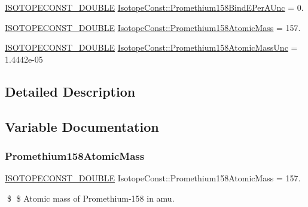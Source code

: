 \begin{DoxyCompactItemize}
\item 
\mbox{\hyperlink{group___isotope_const-_macros_ga8f45a7272ce02c0b4c65c44636ed719a}{I\+S\+O\+T\+O\+P\+E\+C\+O\+N\+S\+T\+\_\+\+D\+O\+U\+B\+LE}} \mbox{\hyperlink{group___isotope_const-_promethium-_pm158_gacf98f43e6d6f0bd043e4616759e9e5e1}{Isotope\+Const\+::\+Promethium158\+Bind\+E\+Per\+A\+Unc}} = 0.
\item 
\mbox{\hyperlink{group___isotope_const-_macros_ga8f45a7272ce02c0b4c65c44636ed719a}{I\+S\+O\+T\+O\+P\+E\+C\+O\+N\+S\+T\+\_\+\+D\+O\+U\+B\+LE}} \mbox{\hyperlink{group___isotope_const-_promethium-_pm158_gaf3b2f32ec08e9432ed95531dfaf3fa6e}{Isotope\+Const\+::\+Promethium158\+Atomic\+Mass}} = 157.
\item 
\mbox{\hyperlink{group___isotope_const-_macros_ga8f45a7272ce02c0b4c65c44636ed719a}{I\+S\+O\+T\+O\+P\+E\+C\+O\+N\+S\+T\+\_\+\+D\+O\+U\+B\+LE}} \mbox{\hyperlink{group___isotope_const-_promethium-_pm158_gab7fda659acc5e7c3ae06221aac8c976e}{Isotope\+Const\+::\+Promethium158\+Atomic\+Mass\+Unc}} = 1.\+4442e-\/05
\end{DoxyCompactItemize}


\subsection{Detailed Description}


\subsection{Variable Documentation}
\mbox{\label{group___isotope_const-_promethium-_pm158_gaf3b2f32ec08e9432ed95531dfaf3fa6e}} 
\subsubsection{\texorpdfstring{Promethium158\+Atomic\+Mass}{Promethium158AtomicMass}}
{\footnotesize\ttfamily \mbox{\hyperlink{group___isotope_const-_macros_ga8f45a7272ce02c0b4c65c44636ed719a}{I\+S\+O\+T\+O\+P\+E\+C\+O\+N\+S\+T\+\_\+\+D\+O\+U\+B\+LE}} Isotope\+Const\+::\+Promethium158\+Atomic\+Mass = 157.}

\$ \$ Atomic mass of Promethium-\/158 in amu. \mbox{\label{group___isotope_const-_promethium-_pm158_gab7fda659acc5e7c3ae06221aac8c976e}} 
